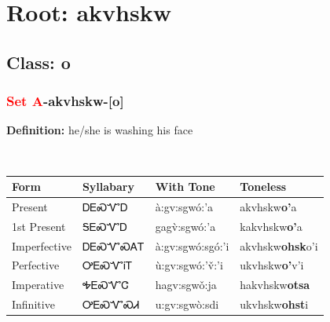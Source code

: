 \needspace{4in}
\section*{Root: akvhskw}
\nopagebreak
{}
\needspace{3in}
\subsection*{Class: o}
\nopagebreak
\needspace{2in}
\subsubsection*{\textcolor{Red}{Set A}{-}\textbf{akvhskw}{-}[o]}
\nopagebreak
\textbf{Definition: } he/she is washing his face
\\[0.5em]
\begin{tabularx}{\textwidth}{l X X X}%
\toprule%
\textbf{Form}&\textbf{Syllabary}&\textbf{With Tone}&\textbf{Toneless}\\%
\midrule%
Present&ᎠᎬᏍᏉᎠ&à:gv:sgwó:’a&akvhskw\textbf{o'}a\\%
1st Present&ᎦᎬᏍᏉᎠ&gagv̀:sgwó:’a&kakvhskw\textbf{o'}a\\%
Imperfective&ᎠᎬᏍᏉᏍᎪᎢ&à:gv:sgwó:sgó:’i&akvhskw\textbf{ohsk}o'i\\%
Perfective&ᎤᎬᏍᏉᎥᎢ&ù:gv:sgwó:’v̌:’i&ukvhskw\textbf{o'}v'i\\%
Imperative&ᎭᎬᏍᏉᏣ&hagv:sgwǒ:ja&hakvhskw\textbf{otsa}\\%
Infinitive&ᎤᎬᏍᏉᏍᏗ&u:gv:sgwò:sdi&ukvhskw\textbf{ohst}i\\%
\bottomrule%
\end{tabularx}
\\[1em]